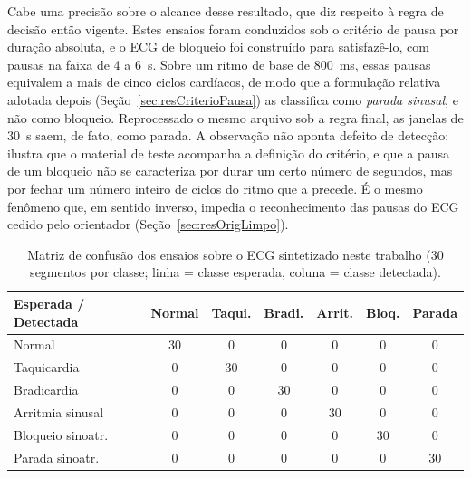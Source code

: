 Cabe uma precisão sobre o alcance desse resultado, que diz respeito à regra de decisão
então vigente. Estes ensaios foram conduzidos sob o critério de pausa por duração absoluta,
e o \acs{ECG} de bloqueio foi construído para satisfazê-lo, com pausas na faixa de 4 a 6~s.
Sobre um ritmo de base de 800~ms, essas pausas equivalem a mais de cinco ciclos cardíacos,
de modo que a formulação relativa adotada depois (Seção~\ref{sec:resCriterioPausa}) as
classifica como \emph{parada sinusal}, e não como bloqueio. Reprocessado o mesmo arquivo
sob a regra final, as janelas de 30~s saem, de fato, como parada. A observação não aponta
defeito de detecção: ilustra que o material de teste acompanha a definição do critério, e
que a pausa de um bloqueio não se caracteriza por durar um certo número de segundos, mas
por fechar um número inteiro de ciclos do ritmo que a precede. É o mesmo fenômeno que, em
sentido inverso, impedia o reconhecimento das pausas do \acs{ECG} cedido pelo orientador
(Seção~\ref{sec:resOrigLimpo}).

\begin{table}[htb]
\centering
\caption{Matriz de confusão dos ensaios sobre o \acs{ECG} sintetizado neste trabalho (30 segmentos por classe; linha = classe esperada, coluna = classe detectada).}
\label{tab:matrizFinal}
\begin{tabular}{l c c c c c c}
\hline
\textbf{Esperada / Detectada} & \textbf{Normal} & \textbf{Taqui.} & \textbf{Bradi.} & \textbf{Arrit.} & \textbf{Bloq.} & \textbf{Parada} \\
\hline
Normal            & 30 & 0  & 0  & 0  & 0  & 0  \\
Taquicardia       & 0  & 30 & 0  & 0  & 0  & 0  \\
Bradicardia       & 0  & 0  & 30 & 0  & 0  & 0  \\
Arritmia sinusal  & 0  & 0  & 0  & 30 & 0  & 0  \\
Bloqueio sinoatr. & 0  & 0  & 0  & 0  & 30 & 0  \\
Parada sinoatr.   & 0  & 0  & 0  & 0  & 0  & 30 \\
\hline
\end{tabular}
\end{table}


